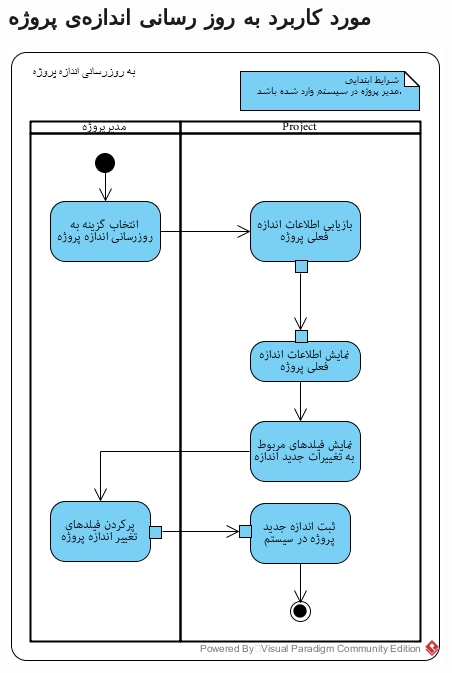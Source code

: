 \subsection*{مورد کاربرد به روز رسانی اندازه‌ی پروژه}
\vspace{2cm}
\begin{center}
\includegraphics[width=\textwidth]{ActivityDiagramsWithSwimlanes/26.jpg}
\end{center}

\newpage
\vspace{2cm}
